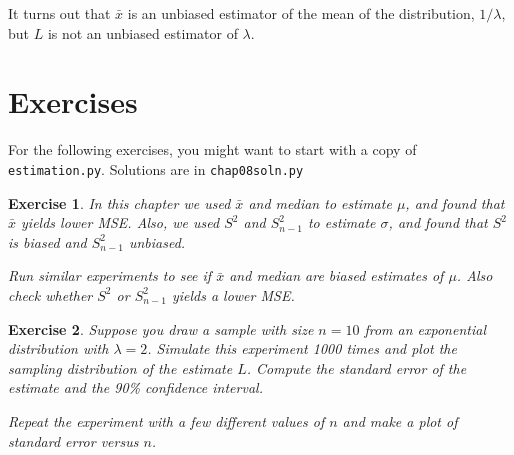 \documentclass[12pt]{book}
\newcommand{\xbar}{\bar{x}}
\newcommand{\lamhat}{L}
\theoremstyle{exercise}
\newtheorem{exercise}{Exercise}[chapter]
\begin{document}
It turns out that $\xbar$ is an unbiased estimator of the mean
of the distribution, $1 / \lambda$, but $L$ is not an unbiased
estimator of $\lambda$.


\section{Exercises}

For the following exercises, you might want to start with a copy of
{\tt estimation.py}.  Solutions are in \verb"chap08soln.py"

\begin{exercise}

In this chapter we used $\xbar$ and median to estimate $\mu$, and
found that $\xbar$  yields lower MSE.
Also, we used $S^2$ and $S_{n-1}^2$ to estimate $\sigma$, and found that
$S^2$ is biased and $S_{n-1}^2$ unbiased.

Run similar experiments to see if $\xbar$ and median are biased estimates
of $\mu$.
Also check whether $S^2$ or $S_{n-1}^2$ yields a lower MSE.%
%
%

\end{exercise}


\begin{exercise}

Suppose you draw a sample with size $n=10$ from 
an exponential distribution with $\lambda=2$.  Simulate
this experiment 1000 times and plot the sampling distribution of
the estimate $\lamhat$.  Compute the standard error of the estimate
and the 90\% confidence interval.%
%
%

Repeat the experiment with a few different values of $n$ and make
a plot of standard error versus $n$.%
%


\end{exercise}
\end{document}
